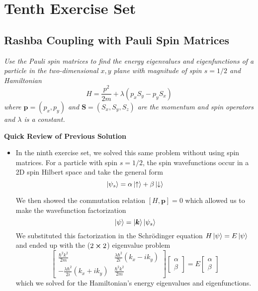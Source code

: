 \documentclass[11pt, a4paper]{article}
\newcommand{\Schro}{Schr\"{o}dinger\xspace}
\renewcommand{\vec}[1]{\bm{#1}} %
\newcommand{\ua}{\uparrow}  %
\newcommand{\da}{\downarrow}  %
\begin{document}
\section{Tenth Exercise Set}

\subsection{Rashba Coupling with Pauli Spin Matrices}
\textit{Use the Pauli spin matrices to find the energy eigenvalues and eigenfunctions of a particle in the two-dimensional $ x, y $ plane with magnitude of spin $ s = 1/2 $ and Hamiltonian}
\begin{equation*}
	H = \frac{p^{2}}{2m} + \lambda (p_{x}S_{y} - p_{y}S_{x})
\end{equation*}
\textit{where $ \vec{p} = (p_{x}, p_{y}) $ and $ \vec{S} = (S_{x}, S_{y}, S_{z}) $ are the momentum and spin operators and $ \lambda $ is a constant.}


\vspace{2mm}
\textbf{Quick Review of Previous Solution}
\begin{itemize}
	\item In the ninth exercise set, we solved this same problem without using spin matrices. For a particle with spin $ s = 1/2 $, the spin wavefunctions occur in a 2D spin Hilbert space and take the general form
	\begin{equation*}
		\ket{\psi_{s}} = \alpha \ket{\ua} + \beta \ket{\da}
	\end{equation*}
	
	We then showed the commutation relation $ [H, \vec{p}] = 0 $ which allowed us to make the wavefunction factorization
	\begin{equation*}
		\ket{\psi} = \ket{\vec{k}}\ket{\psi_{s}}
	\end{equation*}
	We substituted this factorization in the \Schro equation $ H \ket{\psi} = E \ket{\psi} $ and ended up with the ($ 2 \cross 2 $) eigenvalue problem
	\begin{equation*}
		\begin{bmatrix}
		\frac{\hbar^{2}k^{2}}{2m} & \frac{\lambda \hbar^{2}}{2i}(k_{x}-ik_{y}) \\
		-\frac{\lambda \hbar^{2}}{2i}(k_{x}+ik_{y}) & \frac{\hbar^{2}k^{2}}{2m}
		\end{bmatrix}
		\begin{bmatrix}
			\alpha\\
			\beta
		\end{bmatrix}
		= E
		\begin{bmatrix}
			\alpha\\
			\beta
		\end{bmatrix}
	\end{equation*}
	which we solved for the Hamiltonian's energy eigenvalues and eigenfunctions.
\end{itemize}
\end{document}
